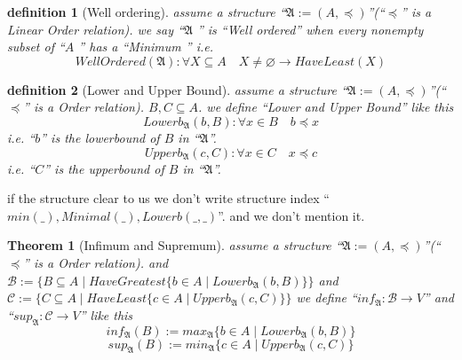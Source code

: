 \documentclass[10pt,a4paper]{book}
\let\emptyset\varnothing
\newtheorem{definition}{definition}[section]
\newtheorem{theorem}{Theorem}[section]
\begin{document}
\begin{definition}
    [Well ordering] assume  a structure ``$\mathfrak{A} := (A , \preceq  ) $''(``$\preceq $'' is a Linear Order relation).
    we say ``$\mathfrak{A} $ '' is ``Well ordered'' when every nonempty subset of ``$A $ '' has a ``Minimum '' i.e.
    \[ WellOrdered(\mathfrak{A}) :   \forall X \subseteq A \quad X \not= \emptyset \to  HaveLeast(X)  \]
\end{definition}

\begin{definition}
    [Lower and Upper Bound] assume  a structure ``$\mathfrak{A} := (A , \preceq  ) $''(``$\preceq $'' is a Order relation).
    $ B,C \subseteq A $. we define ``Lower and Upper Bound'' like this
    \[ Lowerb_\mathfrak{A}(b,B) :   \forall x \in B \quad b \preceq   x  \]
    i.e. ``$b$'' is the lowerbound of $B$ in ``$ \mathfrak{A}$''.
    \[ Upperb_\mathfrak{A}(c,C) :   \forall x \in C \quad x \preceq   c \]
    i.e. ``$C$'' is the upperbound of $B$ in ``$ \mathfrak{A}$''.
\end{definition}

if the structure clear to us we don't write structure index ``$min(\_),
    Minimal(\_) , Lowerb(\_,\_)$''. and we don't mention it.

\begin{theorem}
    [Infimum and Supremum] assume  a structure ``$\mathfrak{A} := (A , \preceq  ) $''(``$\preceq $'' is a Order relation).
    and $\mathcal{B} := \{ B \subseteq A \mid HaveGreatest \{ b \in A \mid Lowerb_\mathfrak{A}(b,B) \} \}$ and
    $ \mathcal{C} := \{ C \subseteq A \mid HaveLeast \{ c \in A \mid Upperb_\mathfrak{A}(c,C) \}  \}$
    we define ``$inf_\mathfrak{A} : \mathcal{B}
        \to V$'' and ``$sup_\mathfrak{A} : \mathcal{C} \to V$'' like this
    \[ inf_\mathfrak{A}(B) :=  max_\mathfrak{A}\{ b \in A \mid Lowerb_\mathfrak{A}(b,B) \}   \]
    \[ sup_\mathfrak{A}(B) :=  min_\mathfrak{A}\{ c \in A \mid Upperb_\mathfrak{A}(c,C) \}  \]

\end{theorem}
\end{document}
